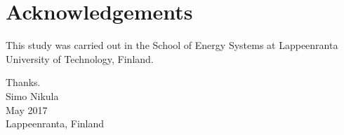 \section*{Acknowledgements}

This study was carried out in the School of Energy Systems
at Lappeenranta University of Technology,
Finland.

Thanks.\\

Simo Nikula\\
May 2017\\
Lappeenranta, Finland\\
